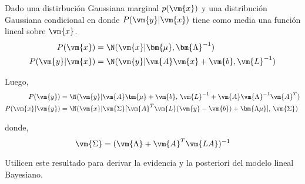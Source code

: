 \begin{framed}
Dado una distirbuci\'on Gaussiana marginal $p(\vm{x})$ y una distribuci\'on Gaussiana condicional en donde $P(\vm{y}|\vm{x})$ tiene como media una funci\'on lineal sobre $\vm{x}$.
\begin{align}
    P(\vm{x}) &=  \N(\vm{x}|\bm{\mu},\bm{\Lambda}^{-1}) \\
   P(\vm{y}|\vm{x}) &=  \N(\vm{y}|\vm{A}\vm{x}+\vm{b},\vm{L}^{-1})    
\end{align}


 Luego,  
\begin{align}
    P(\vm{y}) &=  \N(\vm{y}|\vm{A}\bm{\mu}+\vm{b},\, \vm{L}^{-1} + \vm{A}\vm{\Lambda}^{-1}\vm{A}^T) \\
   P(\vm{x}|\vm{y}) &=  \N(\vm{x}|\vm{\Sigma}[\vm{A}^T \vm{L}(\vm{y}-\vm{b})+ \bm{\Lambda\mu}],\,  \vm{\Sigma})\label{eq:post}
\end{align}

donde, 
\begin{equation}
 \vm{\Sigma} = (\vm{\Lambda} + \vm{A}^T \vm{LA} )^{-1}
\end{equation}
\end{framed}


\vspace{0.3cm}

Utilicen este resultado para derivar la evidencia y la posteriori del modelo lineal Bayesiano.


